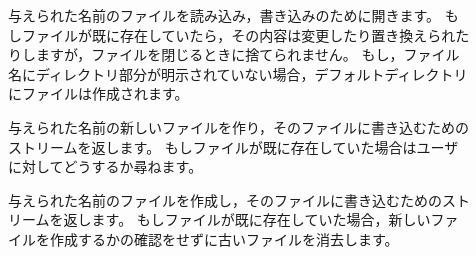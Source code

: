 \documentclass[a4paper,10pt,twoside]{book}
\begin{document}
\begin{description}

%  
%  
%
%
%
\item[] 与えられた名前のファイルを読み込み，書き込みのために開きます。
  もしファイルが既に存在していたら，その内容は変更したり置き換えられたりしますが，ファイルを閉じるときに捨てられません。
  もし，ファイル名にディレクトリ部分が明示されていない場合，デフォルトディレクトリにファイルは作成されます。
  
\item[] 与えられた名前の新しいファイルを作り，そのファイルに書き込むためのストリームを返します。
  もしファイルが既に存在していた場合はユーザに対してどうするか尋ねます。
  
\item[] 与えられた名前のファイルを作成し，そのファイルに書き込むためのストリームを返します。
  もしファイルが既に存在していた場合，新しいファイルを作成するかの確認をせずに古いファイルを消去します。


\end{description}
\end{document}
